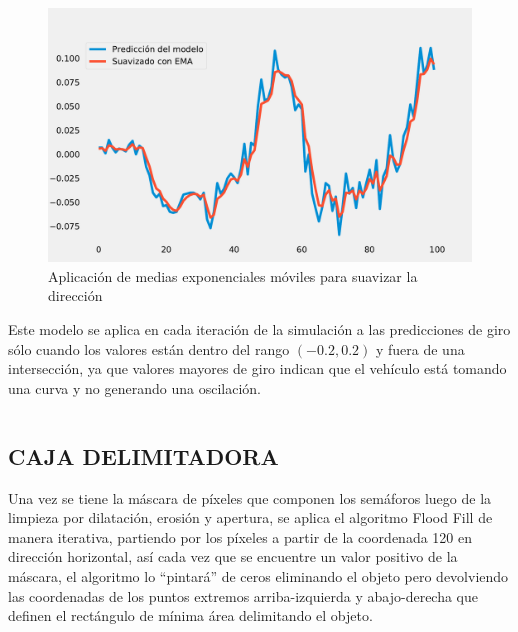 		\begin{figure}[H]
			\centering
			\includegraphics[scale=0.38]{imagenes/ema}
			\caption[Aplicación de medias exponenciales móviles]{Aplicación de medias exponenciales móviles para suavizar la dirección}
			\label{ema}
		\end{figure}
	
		Este modelo se aplica en cada iteración de la simulación a las predicciones de giro sólo cuando los valores están dentro del rango $(-0.2, 0.2)$ y fuera de una intersección, ya que valores mayores de giro indican que el vehículo está tomando una curva y no generando una oscilación.
		
		\inputminted[frame=lines,
		baselinestretch=1,
		fontsize=\footnotesize,
		autogobble]{python}{codigos/marco-aplicativo/ema.py}
		
	\subsection{CAJA DELIMITADORA}
		Una vez se tiene la máscara de píxeles que componen los semáforos luego de la limpieza por dilatación, erosión y apertura, se aplica el algoritmo Flood Fill de manera iterativa, partiendo por los píxeles a partir de la coordenada 120 en dirección horizontal, así cada vez que se encuentre un valor positivo de la máscara, el algoritmo lo ``pintará'' de ceros eliminando el objeto pero devolviendo las coordenadas de los puntos extremos arriba-izquierda y abajo-derecha que definen el rectángulo de mínima área delimitando el objeto.
		
		\inputminted[frame=lines,
		baselinestretch=1,
		fontsize=\footnotesize,
		autogobble]{python}{codigos/marco-aplicativo/flood_fill.py}
		
